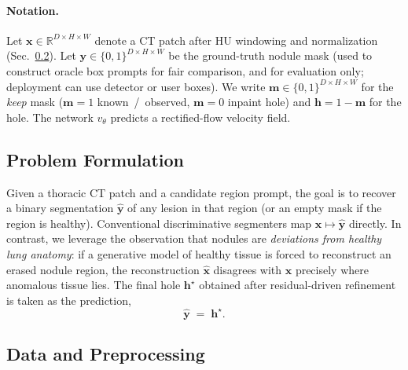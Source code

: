 \documentclass[twoside]{article}
\begin{document}
\paragraph{Notation.}
Let \(\mathbf{x}\in\mathbb{R}^{D\times H\times W}\) denote a CT patch after HU
windowing and normalization (Sec.~\ref{sec:method:data}).
Let \(\mathbf{y}\in\{0,1\}^{D\times H\times W}\) be the ground-truth nodule mask
(used to construct oracle box prompts for fair comparison, and for evaluation
only; deployment can use detector or user boxes).
We write \(\mathbf{m}\in\{0,1\}^{D\times H\times W}\) for the \emph{keep} mask
(\(\mathbf{m}=1\) known~/~observed, \(\mathbf{m}=0\) inpaint hole) and
\(\mathbf{h}=1-\mathbf{m}\) for the hole.
The network \(v_\theta\) predicts a rectified-flow velocity field.

\subsection{Problem Formulation}
\label{sec:method:problem}

Given a thoracic CT patch and a candidate region prompt, the goal is to
recover a binary segmentation \(\hat{\mathbf{y}}\) of any lesion in that region
(or an empty mask if the region is healthy).
Conventional discriminative segmenters map \(\mathbf{x}\mapsto\hat{\mathbf{y}}\)
directly.
In contrast, we leverage the observation that nodules are \emph{deviations from
healthy lung anatomy}: if a generative model of healthy tissue is forced to
reconstruct an erased nodule region, the reconstruction \(\hat{\mathbf{x}}\)
disagrees with \(\mathbf{x}\) precisely where anomalous tissue lies.
The final hole \(\mathbf{h}^\star\) obtained after residual-driven refinement
is taken as the prediction,
\begin{equation}
\hat{\mathbf{y}} \;=\; \mathbf{h}^\star.
\end{equation}

\subsection{Data and Preprocessing}
\label{sec:method:data}
\end{document}
